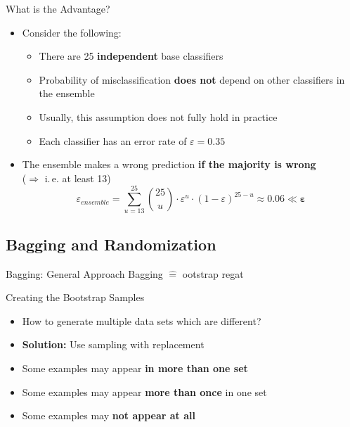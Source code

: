 \begin{frame}{What is the Advantage?}{}
	\begin{itemize}
		\item Consider the following:
		\begin{itemize}
			\item There are 25 \textbf{independent} base classifiers
			\item {}
				Probability of misclassification \textbf{does not} depend on other classifiers in the ensemble
			\item Usually, this assumption does not fully hold in practice
			\item Each classifier has an error rate of $\varepsilon = 0.35$
		\end{itemize}
		\item The ensemble makes a wrong prediction \textbf{if the majority is wrong} \\
			($\Rightarrow$ i.\,e. at least 13)
		\begin{equation}
			\varepsilon_{ensemble}
				= \sum_{u=13}^{25} \binom{25}{u} \cdot \varepsilon^u \cdot (1 - \varepsilon)^{25 - u}
				\approx \bm{0.06 \ll \varepsilon}
		\end{equation}
	\end{itemize}
\end{frame}


\subsection{Bagging and Randomization}

\begin{frame}{Bagging: General Approach}{}\important
	\vspace*{1.5mm}
	Bagging $\widehat{=}$ ootstrap regat
	\vspace*{-2mm}
	
\end{frame}


\begin{frame}{Creating the Bootstrap Samples}{}
	\begin{itemize}
		\item How to generate multiple data sets which are different?
		\item \textbf{Solution:} Use sampling with replacement
		\vspace*{2mm}
		
		\vspace*{2mm}
		\item Some examples may appear \textbf{in more than one set}
		\item Some examples may appear \textbf{more than once} in one set
		\item Some examples may \textbf{not appear at all}
	\end{itemize}
\end{frame}



